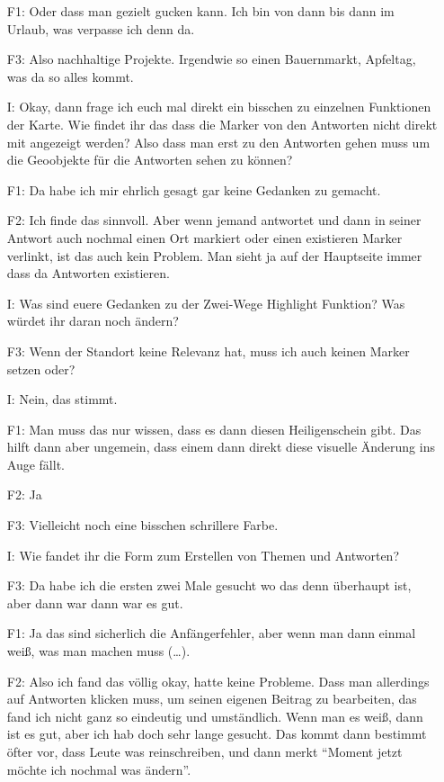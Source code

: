 \begin{itemize}
    \item[F1:] Oder dass man gezielt gucken kann. Ich bin von dann bis dann im Urlaub, was verpasse ich denn da.
    \item[F3:] Also nachhaltige Projekte. Irgendwie so einen Bauernmarkt, Apfeltag, was da so alles kommt.
    \item[I:] Okay, dann frage ich euch mal direkt ein bisschen zu einzelnen Funktionen der Karte. Wie findet ihr das dass die Marker von den Antworten nicht direkt mit angezeigt werden? Also dass man erst zu den Antworten gehen muss um die Geoobjekte für die Antworten sehen zu können?
    \item[F1:] Da habe ich mir ehrlich gesagt gar keine Gedanken zu gemacht.
    \item[F2:] Ich finde das sinnvoll. Aber wenn jemand antwortet und dann in seiner Antwort auch nochmal einen Ort markiert oder einen existieren Marker verlinkt, ist das auch kein Problem. Man sieht ja auf der Hauptseite immer dass da Antworten existieren.
    \item[I:] Was sind euere Gedanken zu der Zwei-Wege Highlight Funktion? Was würdet ihr daran noch ändern?
    \item[F3:] Wenn der Standort keine Relevanz hat, muss ich auch keinen Marker setzen oder?
    \item[I:] Nein, das stimmt.
    \item[F1:] Man muss das nur wissen, dass es dann diesen Heiligenschein gibt. Das hilft dann aber ungemein, dass einem dann direkt diese visuelle {\"A}nderung ins Auge fällt.
    \item[F2:] Ja
    \item[F3:] Vielleicht noch eine bisschen schrillere Farbe.
    \item[I:] Wie fandet ihr die Form zum Erstellen von Themen und Antworten?
    \item[F3:] Da habe ich die ersten zwei Male gesucht wo das denn überhaupt ist, aber dann war dann war es gut.
    \item[F1:] Ja das sind sicherlich die Anfängerfehler, aber wenn man dann einmal weiß, was man machen muss (\dots).
    \item[F2:] Also ich fand das völlig okay, hatte keine Probleme. Dass man allerdings auf Antworten klicken muss, um seinen eigenen Beitrag zu bearbeiten, das fand ich nicht ganz so eindeutig und umständlich. Wenn man es weiß, dann ist es gut, aber ich hab doch sehr lange gesucht. Das kommt dann bestimmt öfter vor, dass Leute was reinschreiben, und dann merkt "`Moment jetzt möchte ich nochmal was ändern"'.

\end{itemize}
